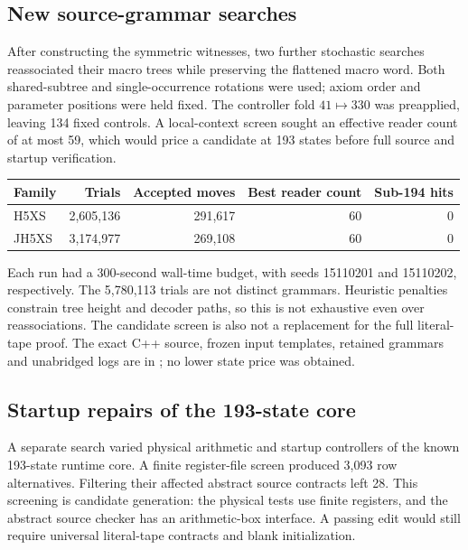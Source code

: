 \subsection{New source-grammar searches}

After constructing the symmetric witnesses, two further stochastic searches
reassociated their macro trees while preserving the flattened macro word.
Both shared-subtree and single-occurrence rotations were used; axiom order
and parameter positions were held fixed.  The controller fold $41\mapsto330$
was preapplied, leaving 134 fixed controls.  A local-context screen sought
an effective reader count of at most 59, which would price a candidate at
193 states before full source and startup verification.

\begin{center}\small
\begin{tabular}{lrrrr}
\toprule
Family & Trials & Accepted moves & Best reader count & Sub-194 hits\\
\midrule
H5XS &2,605,136&291,617&60&0\\
JH5XS &3,174,977&269,108&60&0\\
\bottomrule
\end{tabular}
\end{center}
Each run had a 300-second wall-time budget, with seeds 15110201 and
15110202, respectively.  The 5,780,113 trials are not distinct grammars.
Heuristic penalties constrain tree height and decoder paths, so this is
not exhaustive even over reassociations.  The candidate screen is also
not a replacement for the full literal-tape proof.  The exact C++ source,
frozen input templates, retained grammars and unabridged logs are in
; no lower state price was obtained.

\subsection{Startup repairs of the 193-state core}

A separate search varied physical arithmetic and startup controllers of
the known 193-state runtime core.  A finite register-file screen produced
3,093 row alternatives.  Filtering their affected abstract source
contracts left 28.  This screening is candidate generation: the physical
tests use finite registers, and the abstract source checker has an
arithmetic-box interface.  A passing edit would still require universal
literal-tape contracts and blank initialization.

